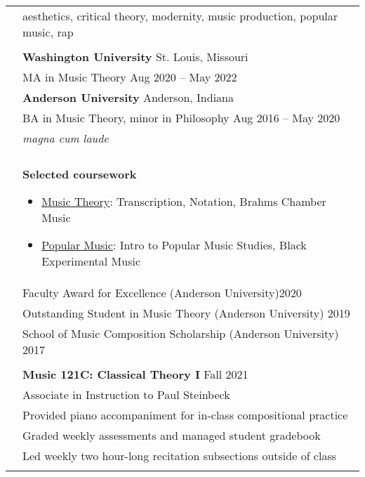 \documentclass[letterpaper, 11pt]{article}
\begin{document}
\begin{longtable}{p{1.3in}p{4.8in}}

\nohyphens{\color{OliveGreen}{Research interests}}
& aesthetics, critical theory, modernity, music production, popular music, rap \\
& \\

\color{OliveGreen}{Education} 
& \textbf{Washington University} \hfill St. Louis, Missouri \\
& MA in Music Theory \hfill Aug 2020 -- May 2022\\

& \textbf{Anderson University} \hfill Anderson, Indiana\\
& BA in Music Theory, minor in Philosophy \hfill Aug 2016 -- May 2020 \\
& {\it magna cum laude}\\
&\\

& \textbf{Selected coursework}
\begin{itemize}[noitemsep,leftmargin=*]
\item \underline{Music Theory}: Transcription, Notation, Brahms Chamber Music
\item \underline{Popular Music}: Intro to Popular Music Studies, Black Experimental Music
\end{itemize} \\

{\color{OliveGreen}{Honors \&}}
& Faculty Award for Excellence (Anderson University)\hfill 2020 \\
{\color{OliveGreen}{Scholarships}} 
& Outstanding Student in Music Theory (Anderson University) \hfill 2019 \\
& School of Music Composition Scholarship (Anderson University) \hfill 2017\\
& \\

{\color{OliveGreen}{Courses Taught}} 
& \textbf{Music 121C: Classical Theory I} \hfill Fall 2021 \\
& Associate in Instruction to Paul Steinbeck \\
& Provided piano accompaniment for in-class compositional practice \\
& Graded weekly assessments and managed student gradebook \\
& Led weekly two hour-long recitation subsections outside of class \\
& \\


\end{longtable}
\end{document}
